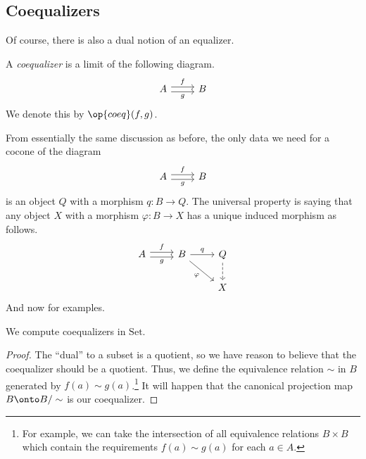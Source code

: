 \subsection{Coequalizers}
Of course, there is also a dual notion of an equalizer.
\begin{defi}[Coequalizer]
	A \textit{coequalizer} is a limit of the following diagram.
	\[\begin{tikzcd}
		A & B
		\arrow["g"', shift right=1, from=1-1, to=1-2]
		\arrow["f", shift left=1, from=1-1, to=1-2]
	\end{tikzcd}\]
	We denote this by $\op{coeq}(f,g)$.
\end{defi}
From essentially the same discussion as before, the only data we need for a cocone of the diagram
\[\begin{tikzcd}
	A & B
	\arrow["g"', shift right=1, from=1-1, to=1-2]
	\arrow["f", shift left=1, from=1-1, to=1-2]
\end{tikzcd}\]
is an object $Q$ with a morphism $q:B\to Q$. The universal property is saying that any object $X$ with a morphism $\varphi:B\to X$ has a unique induced morphism as follows.
\[\begin{tikzcd}
	A & B & Q \\
	&& X
	\arrow["g"', shift right=1, from=1-1, to=1-2]
	\arrow["f", shift left=1, from=1-1, to=1-2]
	\arrow["q", from=1-2, to=1-3]
	\arrow[dashed, from=1-3, to=2-3]
	\arrow["\varphi"', from=1-2, to=2-3]
\end{tikzcd}\]
And now for examples.
\begin{exe}
	We compute coequalizers in $\mathrm{Set}$.
\end{exe}
\begin{proof}
	The ``dual'' to a subset is a quotient, so we have reason to believe that the coequalizer should be a quotient. Thus, we define the equivalence relation $\sim$ in $B$ generated by $f(a)\sim g(a)$.\footnote{For example, we can take the intersection of all equivalence relations $B\times B$ which contain the requirements $f(a)\sim g(a)$ for each $a\in A$.} It will happen that the canonical projection map $B\onto B/\sim$ is our coequalizer.
\end{proof}